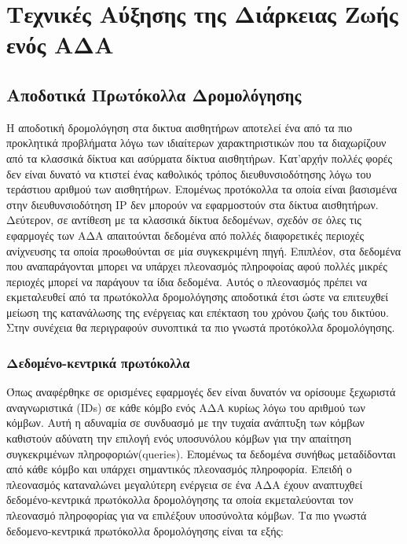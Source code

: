 
\chapter{Τεχνικές Αύξησης της Διάρκειας Ζωής ενός ΑΔΑ}


\section{Αποδοτικά Πρωτόκολλα Δρομολόγησης}
Η αποδοτική δρομολόγηση στα δικτυα αισθητήρων αποτελεί ένα από τα πιο προκλητικά προβλήματα λόγω των ιδιαίτερων χαρακτηριστικών που τα διαχωρίζουν από τα κλασσικά
δίκτυα και ασύρματα δίκτυα αισθητήρων.
Κατ'αρχήν πολλές φορές δεν είναι δυνατό να κτιστεί ένας καθολικός τρόπος διευθυνσιοδότησης λόγω του τεράστιου αριθμού των αισθητήρων.
Επομένως προτόκολλα τα οποία είναι βασισμένα στην διευθυνσιοδότηση IP δεν μπορούν να εφαρμοστούν στα δίκτυα αισθητήρων.
Δεύτερον, σε αντίθεση με τα κλασσικά δίκτυα δεδομένων, σχεδόν σε όλες τις εφαρμογές των ΑΔΑ απαιτούνται δεδομένα από πολλές διαφορετικές περιοχές ανίχνευσης τα
οποία προωθούνται σε μία συγκεκριμένη πηγή.
Επιπλέον, στα δεδομένα που αναπαράγονται μπορει να υπάρχει πλεονασμός πληροφοίας αφού πολλές μικρές περιοχές μπορεί να παράγουν τα ίδια δεδομένα.
Αυτός ο πλεονασμός πρέπει να εκμεταλευθεί από τα πρωτόκολλα δρομολόγησης αποδοτικά έτσι ώστε να επιτευχθεί μείωση της κατανάλωσης της ενέργειας και επέκταση του
χρόνου ζωής του δικτύου.
Στην συνέχεια θα περιγραφούν συνοπτικά τα πιο γνωστά προτόκολλα δρομολόγησης.


\subsection{Δεδομένο-κεντρικά πρωτόκολλα}
Όπως αναφέρθηκε σε ορισμένες εφαρμογές δεν είναι δυνατόν να ορίσουμε ξεχωριστά αναγνωριστικά (IDs) σε κάθε κόμβο ενός ΑΔΑ κυρίως λόγω του αριθμού των κόμβων.
Αυτή η αδυναμία σε συνδυασμό με την τυχαία ανάπτυξη των κόμβων καθιστούν αδύνατη την επιλογή ενός υποσυνόλου κόμβων για την απαίτηση
συγκεκριμένων πληροφοριών(queries).
Επομένως τα δεδομένα συνήθως μεταδίδονται από κάθε κόμβο και υπάρχει σημαντικός πλεονασμός πληροφορία.
Επειδή ο πλεονασμός καταναλώνει μεγαλύτερη ενέργεια σε ένα ΑΔΑ έχουν αναπτυχθεί δεδομένο-κεντρικά πρωτόκολλα δρομολόγησης τα οποία εκμεταλεύονται τον πλεονασμό
πληροφορίας για να επιλέξουν υποσύνολτα κόμβων. Τα πιο γνωστά δεδομενο-κεντρικά πρωτόκολλα δρομολόγησης είναι τα εξής:


